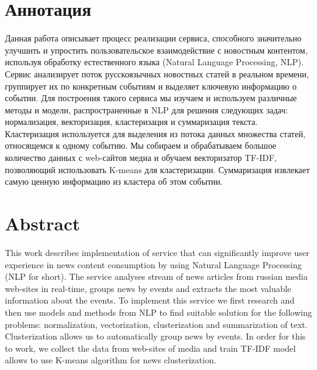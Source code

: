 \titleformat{\section}[block]
{\centering\fontsize{16pt}{18pt}\selectfont\bfseries}{\thesection\cftsecaftersnum}{0.5em}{} %

\section*{Аннотация}
Данная работа описывает процесс реализации сервиса, способного значительно улучшить
и упростить пользовательское взаимодействие с новостным контентом, используя обработку
естественного языка (Natural Language Processing, NLP). Сервис анализирует поток русскоязычных новостных статей в реальном времени, группирует их по конкретным событиям и выделяет ключевую информацию о событии.
Для построения такого сервиса мы изучаем и используем различные методы и модели, распространенные в NLP для решения следующих задач:
нормализация, векторизация, кластеризация и суммаризация текста.
Кластеризация используется для выделения из потока данных множества статей, относящемся к одному событию.
Мы собираем и обрабатываем большое количество данных с web-сайтов медиа и обучаем векторизатор TF-IDF, позволяющий использовать K-means для кластеризации.
Суммаризация извлекает самую ценную информацию из кластера об этом событии.


\section*{Abstract}
This work describes implementation of service that can significantly improve user experience in news content consumption by using Natural Language Processing (NLP for short). The service analyses stream of news articles from russian media web-sites in real-time, groups news by events and extracts the most valuable information about the events.
To implement this service we first research and then use models and methods from NLP to find suitable solution for the following problems: normalization, vectorization, clusterization and summarization of text.
Clusterization allows us to automatically group news by events. In order for this to work, we collect the data from web-sites of media and train TF-IDF model allows to use K-means algorithm for news clusterization. 

\titleformat{\section}[block]
{\raggedright\fontsize{16pt}{18pt}\selectfont\bfseries}{\thesection\cftsecaftersnum}{0.5em}{} %